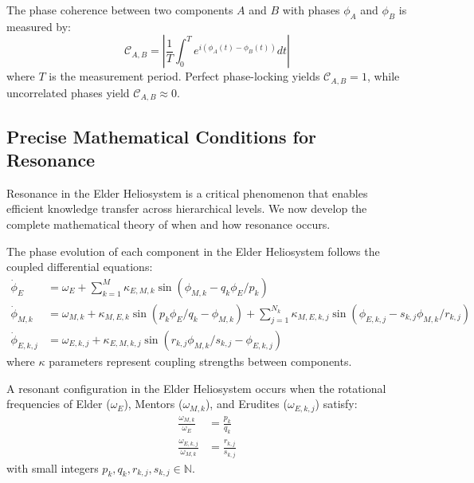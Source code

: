 \begin{definition}
The phase coherence between two components $A$ and $B$ with phases $\phi_A$ and $\phi_B$ is measured by:
\begin{equation}
\mathcal{C}_{A,B} = \left| \frac{1}{T} \int_0^T e^{i(\phi_A(t) - \phi_B(t))} dt \right|
\end{equation}
where $T$ is the measurement period. Perfect phase-locking yields $\mathcal{C}_{A,B} = 1$, while uncorrelated phases yield $\mathcal{C}_{A,B} \approx 0$.
\end{definition}

\subsection{Precise Mathematical Conditions for Resonance}

Resonance in the Elder Heliosystem is a critical phenomenon that enables efficient knowledge transfer across hierarchical levels. We now develop the complete mathematical theory of when and how resonance occurs.

\begin{definition}
The phase evolution of each component in the Elder Heliosystem follows the coupled differential equations:
\begin{align}
\dot{\phi}_E &= \omega_E + \sum_{k=1}^M \kappa_{E,M,k} \sin(\phi_{M,k} - q_k\phi_E/p_k) \\
\dot{\phi}_{M,k} &= \omega_{M,k} + \kappa_{M,E,k} \sin(p_k\phi_E/q_k - \phi_{M,k}) + \sum_{j=1}^{N_k} \kappa_{M,E,k,j} \sin(\phi_{E,k,j} - s_{k,j}\phi_{M,k}/r_{k,j}) \\
\dot{\phi}_{E,k,j} &= \omega_{E,k,j} + \kappa_{E,M,k,j} \sin(r_{k,j}\phi_{M,k}/s_{k,j} - \phi_{E,k,j})
\end{align}
where $\kappa$ parameters represent coupling strengths between components.
\end{definition}

\begin{theorem}
A resonant configuration in the Elder Heliosystem occurs when the rotational frequencies of Elder ($\omega_E$), Mentors ($\omega_{M,k}$), and Erudites ($\omega_{E,k,j}$) satisfy:
\begin{align}
\frac{\omega_{M,k}}{\omega_E} &= \frac{p_k}{q_k} \\
\frac{\omega_{E,k,j}}{\omega_{M,k}} &= \frac{r_{k,j}}{s_{k,j}}
\end{align}
with small integers $p_k, q_k, r_{k,j}, s_{k,j} \in \mathbb{N}$.
\end{theorem}

